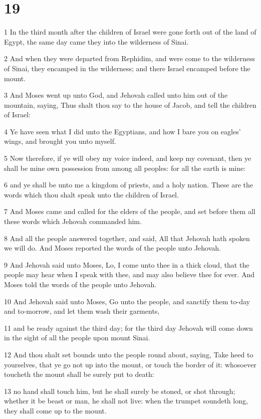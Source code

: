 \chapter{19}

\par 1 In the third month after the children of Israel were gone forth out of the land of Egypt, the same day came they into the wilderness of Sinai.
\par 2 And when they were departed from Rephidim, and were come to the wilderness of Sinai, they encamped in the wilderness; and there Israel encamped before the mount.
\par 3 And Moses went up unto God, and Jehovah called unto him out of the mountain, saying, Thus shalt thou say to the house of Jacob, and tell the children of Israel:
\par 4 Ye have seen what I did unto the Egyptians, and how I bare you on eagles' wings, and brought you unto myself.
\par 5 Now therefore, if ye will obey my voice indeed, and keep my covenant, then ye shall be mine own possession from among all peoples: for all the earth is mine:
\par 6 and ye shall be unto me a kingdom of priests, and a holy nation. These are the words which thou shalt speak unto the children of Israel.
\par 7 And Moses came and called for the elders of the people, and set before them all these words which Jehovah commanded him.
\par 8 And all the people answered together, and said, All that Jehovah hath spoken we will do. And Moses reported the words of the people unto Jehovah.
\par 9 And Jehovah said unto Moses, Lo, I come unto thee in a thick cloud, that the people may hear when I speak with thee, and may also believe thee for ever. And Moses told the words of the people unto Jehovah.
\par 10 And Jehovah said unto Moses, Go unto the people, and sanctify them to-day and to-morrow, and let them wash their garments,
\par 11 and be ready against the third day; for the third day Jehovah will come down in the sight of all the people upon mount Sinai.
\par 12 And thou shalt set bounds unto the people round about, saying, Take heed to yourselves, that ye go not up into the mount, or touch the border of it: whosoever toucheth the mount shall be surely put to death:
\par 13 no hand shall touch him, but he shall surely be stoned, or shot through; whether it be beast or man, he shall not live: when the trumpet soundeth long, they shall come up to the mount.
